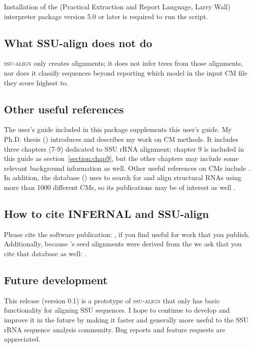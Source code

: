 Installation of the  (Practical Extraction and Report Language,
Larry Wall) interpreter package version 5.0 or later is required to
run the   script.

\subsection{What SSU-align does not do}

\textsc{ssu-align} only creates alignments; it does not infer trees
from those alignments, nor does it classify sequences beyond reporting
which model in the input CM file they score highest to.

\subsection{Other useful references}

The  user's guide \cite{infernalguide} included in
this package supplements this user's guide. My Ph.D. thesis 
()
introduces and describes my work on CM methods. It includes three chapters (7-9) dedicated to
SSU rRNA alignment; chapter 9 is included in this guide as
section~\ref{section:chap9}, but the other chapters may include some
relevant background information as well. 
Other useful references on CMs include
\cite{Eddy94,Eddy02b,NawrockiEddy07,Nawrocki09,KolbeEddy09}. In
addition, the  database 
()
uses  to search for and align
structural RNAs using more than 1000 different CMs, so its
publications may be of interest as well
\cite{Griffiths-Jones03,Griffiths-Jones05,Gardner09}.

\subsection{How to cite INFERNAL and SSU-align}

Please cite the  software publication:
\cite{Nawrocki09}, if you find  useful for work that
you publish. Additionally, because 's seed alignments were
derived from the  we ask that you cite
that database as well: \cite{CannoneGutell02}. 

\subsection{Future development}

This release (version 0.1) is a prototype of \textsc{ssu-align} that
only has basic functionality for aligning SSU sequences. I hope to
continue to develop and improve it in the future by making it faster
and generally more useful to the SSU rRNA sequence analysis
community. Bug reports and feature requests are appreciated.
